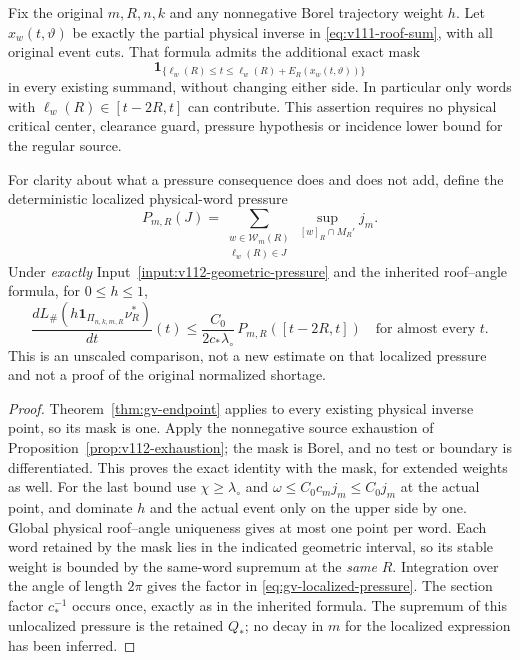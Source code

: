 \begin{proposition}
\label{prop:gv-source}
Fix the original $m,R,n,k$ and any nonnegative Borel trajectory weight
$h$. Let $x_w(t,\vartheta)$ be exactly the partial physical inverse
in \eqref{eq:v111-roof-sum}, with all original event cuts. That formula
admits the additional exact mask
\begin{equation}\label{eq:gv-source-mask}
 \mathbf1_{\{\ell_w(R)\le t\le\ell_w(R)+E_R(x_w(t,\vartheta))\}}
\end{equation}
in every existing summand, without changing either side. In particular
only words with $\ell_w(R)\in[t-2R,t]$ can contribute. This assertion
requires no physical critical center, clearance guard, pressure
hypothesis or incidence lower bound for the regular source.

For clarity about what a pressure consequence does and does not add,
define the deterministic localized physical-word pressure
\[
 P_{m,R}(J)=\sum_{\substack{w\in\mathcal W_m(R)\\\ell_w(R)\in J}}
                       \sup_{[w]_R\cap M_R'}j_m.
\]
Under \emph{exactly} Input~\ref{input:v112-geometric-pressure} and
the inherited roof--angle formula, for $0\le h\le1$,
\begin{equation}\label{eq:gv-localized-pressure}
 \frac{dL_\#(h\mathbf1_{\Pi_{n,k,m,R}}\nu_R^*)}{dt}(t)
 \le\frac{C_0}{2c_*\lambda_\circ}\,P_{m,R}([t-2R,t])
 \quad\text{for almost every }t.
\end{equation}
This is an unscaled comparison, not a new estimate on that localized
pressure and not a proof of the original normalized shortage.
\end{proposition}
\begin{proof}
Theorem~\ref{thm:gv-endpoint} applies to every existing physical
inverse point, so its mask is one. Apply the nonnegative source
exhaustion of Proposition~\ref{prop:v112-exhaustion}; the mask is
Borel, and no test or boundary is differentiated. This proves the
exact identity with the mask, for extended weights as well.
For the last bound use $\chi\ge\lambda_\circ$ and
$\omega\le C_0c_mj_m\le C_0j_m$ at the actual point, and dominate
$h$ and the actual event only on the upper side by one. Global
physical roof--angle uniqueness gives at most one point per word.
Each word retained by the mask lies in the indicated geometric
interval, so its stable weight is bounded by the same-word supremum
at the \emph{same} $R$. Integration over the angle of length $2\pi$
gives the factor in \eqref{eq:gv-localized-pressure}. The section
factor $c_*^{-1}$ occurs once, exactly as in the inherited formula.
The supremum of this unlocalized pressure is the retained $Q_*$;
no decay in $m$ for the localized expression has been inferred.
\end{proof}

